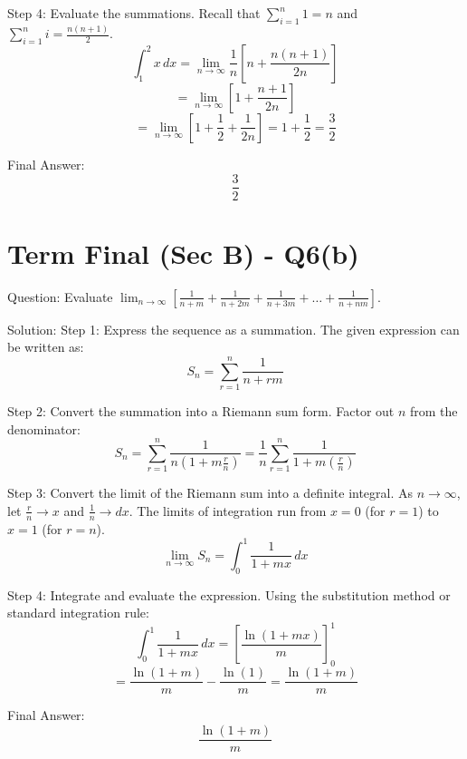 \documentclass{article}
\begin{document}
Step 4: Evaluate the summations.
Recall that \(\sum_{i=1}^{n} 1 = n\) and \(\sum_{i=1}^{n} i = \frac{n(n+1)}{2}\).
\[
\int_1^2 x \, dx = \lim_{n \to \infty} \frac{1}{n} \left[ n + \frac{n(n+1)}{2n} \right]
\]
\[
= \lim_{n \to \infty} \left[ 1 + \frac{n+1}{2n} \right]
\]
\[
= \lim_{n \to \infty} \left[ 1 + \frac{1}{2} + \frac{1}{2n} \right] = 1 + \frac{1}{2} = \frac{3}{2}
\]

Final Answer:
\[
\boxed{\frac{3}{2}}
\]

\section*{Term Final (Sec B) - Q6(b)}
Question:
Evaluate \(\lim_{n \to \infty} \left[\frac{1}{n+m} + \frac{1}{n+2m} + \frac{1}{n+3m} + \dots + \frac{1}{n+nm}\right]\).

Solution:
Step 1: Express the sequence as a summation.
The given expression can be written as:
\[
S_n = \sum_{r=1}^{n} \frac{1}{n+rm}
\]

Step 2: Convert the summation into a Riemann sum form.
Factor out \(n\) from the denominator:
\[
S_n = \sum_{r=1}^{n} \frac{1}{n\left(1 + m\frac{r}{n}\right)} = \frac{1}{n} \sum_{r=1}^{n} \frac{1}{1 + m\left(\frac{r}{n}\right)}
\]

Step 3: Convert the limit of the Riemann sum into a definite integral.
As \(n \to \infty\), let \(\frac{r}{n} \to x\) and \(\frac{1}{n} \to dx\). The limits of integration run from \(x = 0\) (for \(r=1\)) to \(x = 1\) (for \(r=n\)).
\[
\lim_{n \to \infty} S_n = \int_0^1 \frac{1}{1+mx} \, dx
\]

Step 4: Integrate and evaluate the expression.
Using the substitution method or standard integration rule:
\[
\int_0^1 \frac{1}{1+mx} \, dx = \left[ \frac{\ln(1+mx)}{m} \right]_0^1
\]
\[
= \frac{\ln(1+m)}{m} - \frac{\ln(1)}{m} = \frac{\ln(1+m)}{m}
\]

Final Answer:
\[
\boxed{\frac{\ln(1+m)}{m}}
\]
\end{document}
